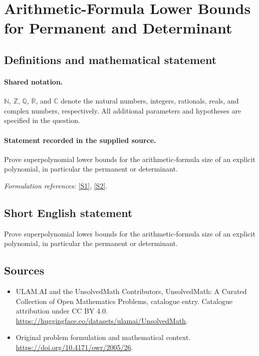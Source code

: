 \documentclass[11pt]{article}
\newcommand{\sref}[2]{\hyperlink{source:#1:#2}{[S#2]}}
\begin{document}
\section{Arithmetic-Formula Lower Bounds for Permanent and Determinant}\label{statement}

\subsection{Definitions and mathematical statement}

\paragraph{Shared notation.}$\mathbb N$, $\mathbb Z$, $\mathbb Q$, $\mathbb R$, and $\mathbb C$ denote the natural numbers, integers, rationals, reals, and complex numbers, respectively. All additional parameters and hypotheses are specified in the question.


\paragraph{Statement recorded in the supplied source.}
Prove superpolynomial lower bounds for the arithmetic-formula size of an explicit polynomial, in particular the permanent or determinant.
\par\smallskip\textit{Formulation references:} \sref{statement}{1}, \sref{statement}{2}.
\subsection{Short English statement}
Prove superpolynomial lower bounds for the arithmetic-formula size of an explicit polynomial, in particular the permanent or determinant.
\subsection{Sources}
\begin{itemize}
\item[\hypertarget{source:statement:1}{S1}] ULAM.AI and the UnsolvedMath Contributors, UnsolvedMath: A Curated Collection of Open Mathematics Problems, catalogue entry. Catalogue attribution under CC BY 4.0.
\url{https://huggingface.co/datasets/ulamai/UnsolvedMath}.
\item[\hypertarget{source:statement:2}{S2}] Original problem formulation and mathematical context.
\url{https://doi.org/10.4171/owr/2005/26}.
\end{itemize}
\label{end:statement}
\end{document}
